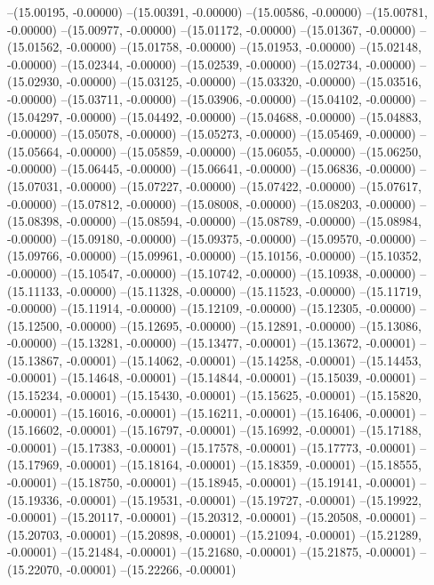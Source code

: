 --(15.00195, -0.00000)
--(15.00391, -0.00000)
--(15.00586, -0.00000)
--(15.00781, -0.00000)
--(15.00977, -0.00000)
--(15.01172, -0.00000)
--(15.01367, -0.00000)
--(15.01562, -0.00000)
--(15.01758, -0.00000)
--(15.01953, -0.00000)
--(15.02148, -0.00000)
--(15.02344, -0.00000)
--(15.02539, -0.00000)
--(15.02734, -0.00000)
--(15.02930, -0.00000)
--(15.03125, -0.00000)
--(15.03320, -0.00000)
--(15.03516, -0.00000)
--(15.03711, -0.00000)
--(15.03906, -0.00000)
--(15.04102, -0.00000)
--(15.04297, -0.00000)
--(15.04492, -0.00000)
--(15.04688, -0.00000)
--(15.04883, -0.00000)
--(15.05078, -0.00000)
--(15.05273, -0.00000)
--(15.05469, -0.00000)
--(15.05664, -0.00000)
--(15.05859, -0.00000)
--(15.06055, -0.00000)
--(15.06250, -0.00000)
--(15.06445, -0.00000)
--(15.06641, -0.00000)
--(15.06836, -0.00000)
--(15.07031, -0.00000)
--(15.07227, -0.00000)
--(15.07422, -0.00000)
--(15.07617, -0.00000)
--(15.07812, -0.00000)
--(15.08008, -0.00000)
--(15.08203, -0.00000)
--(15.08398, -0.00000)
--(15.08594, -0.00000)
--(15.08789, -0.00000)
--(15.08984, -0.00000)
--(15.09180, -0.00000)
--(15.09375, -0.00000)
--(15.09570, -0.00000)
--(15.09766, -0.00000)
--(15.09961, -0.00000)
--(15.10156, -0.00000)
--(15.10352, -0.00000)
--(15.10547, -0.00000)
--(15.10742, -0.00000)
--(15.10938, -0.00000)
--(15.11133, -0.00000)
--(15.11328, -0.00000)
--(15.11523, -0.00000)
--(15.11719, -0.00000)
--(15.11914, -0.00000)
--(15.12109, -0.00000)
--(15.12305, -0.00000)
--(15.12500, -0.00000)
--(15.12695, -0.00000)
--(15.12891, -0.00000)
--(15.13086, -0.00000)
--(15.13281, -0.00000)
--(15.13477, -0.00001)
--(15.13672, -0.00001)
--(15.13867, -0.00001)
--(15.14062, -0.00001)
--(15.14258, -0.00001)
--(15.14453, -0.00001)
--(15.14648, -0.00001)
--(15.14844, -0.00001)
--(15.15039, -0.00001)
--(15.15234, -0.00001)
--(15.15430, -0.00001)
--(15.15625, -0.00001)
--(15.15820, -0.00001)
--(15.16016, -0.00001)
--(15.16211, -0.00001)
--(15.16406, -0.00001)
--(15.16602, -0.00001)
--(15.16797, -0.00001)
--(15.16992, -0.00001)
--(15.17188, -0.00001)
--(15.17383, -0.00001)
--(15.17578, -0.00001)
--(15.17773, -0.00001)
--(15.17969, -0.00001)
--(15.18164, -0.00001)
--(15.18359, -0.00001)
--(15.18555, -0.00001)
--(15.18750, -0.00001)
--(15.18945, -0.00001)
--(15.19141, -0.00001)
--(15.19336, -0.00001)
--(15.19531, -0.00001)
--(15.19727, -0.00001)
--(15.19922, -0.00001)
--(15.20117, -0.00001)
--(15.20312, -0.00001)
--(15.20508, -0.00001)
--(15.20703, -0.00001)
--(15.20898, -0.00001)
--(15.21094, -0.00001)
--(15.21289, -0.00001)
--(15.21484, -0.00001)
--(15.21680, -0.00001)
--(15.21875, -0.00001)
--(15.22070, -0.00001)
--(15.22266, -0.00001)
